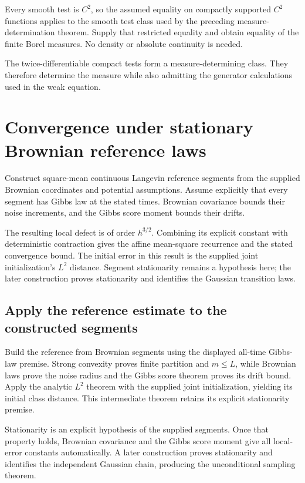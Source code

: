 \documentclass[11pt,a4paper]{report}
\begin{document}
Every smooth test is \(C^2\), so the assumed equality on compactly supported \(C^2\) functions applies to the smooth test class used by the preceding measure-determination theorem. Supply that restricted equality and obtain equality of the finite Borel measures. No density or absolute continuity is needed.



The twice-differentiable compact tests form a measure-determining class. They therefore determine the measure while also admitting the generator calculations used in the weak equation.

\section{\texorpdfstring{Convergence under stationary Brownian reference laws}{Convergence under stationary Brownian reference laws}}
\label{proof-module-UnadjustedLangevin-ULAFromBrownian-lean}


Construct square-mean continuous Langevin reference segments from the supplied Brownian coordinates and potential assumptions. Assume explicitly that every segment has Gibbs law at the stated times. Brownian covariance bounds their noise increments, and the Gibbs score moment bounds their drifts.



The resulting local defect is of order \(h^{3/2}\). Combining its explicit constant with deterministic contraction gives the affine mean-square recurrence and the stated convergence bound. The initial error in this result is the supplied joint initialization's \(L^2\) distance. Segment stationarity remains a hypothesis here; the later construction proves stationarity and identifies the Gaussian transition laws.

\subsection{\texorpdfstring{Apply the reference estimate to the constructed segments}{Apply the reference estimate to the constructed segments}}
\label{report-step-UnadjustedLangevin-ULAFromBrownian-lean-1}


Build the reference from Brownian segments using the displayed all-time Gibbs-law premise. Strong convexity proves finite partition and \(m\le L\), while Brownian laws prove the noise radius and the Gibbs score theorem proves its drift bound. Apply the analytic \(L^2\) theorem with the supplied joint initialization, yielding its initial class distance. This intermediate theorem retains its explicit stationarity premise.



Stationarity is an explicit hypothesis of the supplied segments. Once that property holds, Brownian covariance and the Gibbs score moment give all local-error constants automatically. A later construction proves stationarity and identifies the independent Gaussian chain, producing the unconditional sampling theorem.
\end{document}
